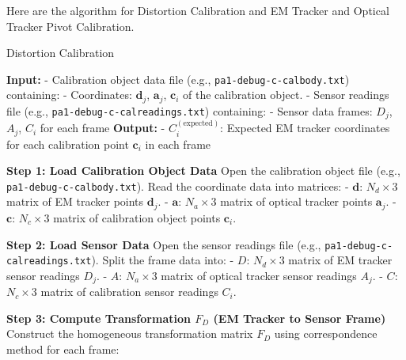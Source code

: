 \documentclass[english,10pt,a4paper]{book}
\begin{document}
    Here are the algorithm for Distortion Calibration and EM Tracker and Optical Tracker Pivot Calibration.
    \begin{algorithm}[H]
    	\caption{Distortion Calibration}
    	\begin{algorithmic}[1]
    		\Statex \textbf{Input:}
    		\Statex - Calibration object data file (e.g., \texttt{pa1-debug-c-calbody.txt}) containing:
    		\Statex \hspace{1em} - Coordinates: \( \mathbf{d}_j \), \( \mathbf{a}_j \), \( \mathbf{c}_i \) of the calibration object.
    		\Statex - Sensor readings file (e.g., \texttt{pa1-debug-c-calreadings.txt}) containing:
    		\Statex \hspace{1em} - Sensor data frames: \( D_j \), \( A_j \), \( C_i \) for each frame
    		\Statex \textbf{Output:}
    		\Statex - \( C_i^{(\text{expected})} \): Expected EM tracker coordinates for each calibration point \( \mathbf{c}_i \) in each frame
    		
    		\State \textbf{Step 1: Load Calibration Object Data}
    		\State Open the calibration object file (e.g., \texttt{pa1-debug-c-calbody.txt}).
    		\State Read the coordinate data into matrices:
    		\State \hspace{1em} - \( \mathbf{d} \): \( N_d \times 3 \) matrix of EM tracker points \( \mathbf{d}_j \).
    		\State \hspace{1em} - \( \mathbf{a} \): \( N_a \times 3 \) matrix of optical tracker points \( \mathbf{a}_j \).
    		\State \hspace{1em} - \( \mathbf{c} \): \( N_c \times 3 \) matrix of calibration object points \( \mathbf{c}_i \).
    		
    		\State \textbf{Step 2: Load Sensor Data}
    		\State Open the sensor readings file (e.g., \texttt{pa1-debug-c-calreadings.txt}).
    		\State Split the frame data into:
    		\State \hspace{1em} - \( D \): \( N_d \times 3 \) matrix of EM tracker sensor readings \( D_j \).
    		\State \hspace{1em} - \( A \): \( N_a \times 3 \) matrix of optical tracker sensor readings \( A_j \).
    		\State \hspace{1em} - \( C \): \( N_c \times 3 \) matrix of calibration sensor readings \( C_i \).
    		
    		\State \textbf{Step 3: Compute Transformation \( F_D \) (EM Tracker to Sensor Frame)}
    		\State Construct the homogeneous transformation matrix \( F_D \) using correspondence method for each frame:
    		

\end{algorithmic}
\end{algorithm}
\end{document}

